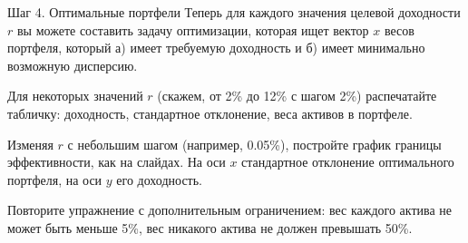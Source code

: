 \documentclass{beamer}
\begin{document}
\begin{frame}{Шаг 4. Оптимальные портфели}
\justify
Теперь для каждого значения целевой доходности $r$ вы можете составить задачу оптимизации, которая ищет вектор $x$ весов портфеля, который а) имеет требуемую доходность и б) имеет минимально возможную дисперсию.

\justify
Для некоторых значений $r$ (скажем, от 2\% до 12\% с шагом 2\%) распечатайте табличку: доходность, стандартное отклонение, веса активов в портфеле. 

\justify
Изменяя $r$ с небольшим шагом (например, 0.05\%), постройте график границы эффективности, как на слайдах. На оси $x$ стандартное отклонение оптимального портфеля, на оси $y$ его доходность.

\justify
Повторите упражнение с дополнительным ограничением: вес каждого актива не может быть меньше 5\%, вес никакого актива не должен превышать 50\%.
\end{frame}
\end{document}
